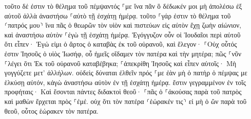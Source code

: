 \documentclass{openreader}
\begin{document}
τοῦτο δέ ἐστιν τὸ θέλημα τοῦ πέμψαντός ⸀με ἵνα πᾶν ὃ δέδωκέν μοι μὴ ἀπολέσω ἐξ αὐτοῦ ἀλλὰ ἀναστήσω ⸀αὐτὸ τῇ ἐσχάτῃ ἡμέρᾳ. 
τοῦτο ⸀γάρ ἐστιν τὸ θέλημα τοῦ ⸂πατρός μου⸃ ἵνα πᾶς ὁ θεωρῶν τὸν υἱὸν καὶ πιστεύων εἰς αὐτὸν ἔχῃ ζωὴν αἰώνιον, καὶ ἀναστήσω αὐτὸν ⸀ἐγὼ τῇ ἐσχάτῃ ἡμέρᾳ. 
Ἐγόγγυζον οὖν οἱ Ἰουδαῖοι περὶ αὐτοῦ ὅτι εἶπεν· Ἐγώ εἰμι ὁ ἄρτος ὁ καταβὰς ἐκ τοῦ οὐρανοῦ, 
καὶ ἔλεγον· ⸀Οὐχ οὗτός ἐστιν Ἰησοῦς ὁ υἱὸς Ἰωσήφ, οὗ ἡμεῖς οἴδαμεν τὸν πατέρα καὶ τὴν μητέρα; πῶς ⸀νῦν ⸀λέγει ὅτι Ἐκ τοῦ οὐρανοῦ καταβέβηκα; 
⸀ἀπεκρίθη Ἰησοῦς καὶ εἶπεν αὐτοῖς· Μὴ γογγύζετε μετ’ ἀλλήλων. 
οὐδεὶς δύναται ἐλθεῖν πρός ⸀με ἐὰν μὴ ὁ πατὴρ ὁ πέμψας με ἑλκύσῃ αὐτόν, κἀγὼ ἀναστήσω αὐτὸν ἐν τῇ ἐσχάτῃ ἡμέρᾳ. 
ἔστιν γεγραμμένον ἐν τοῖς προφήταις· Καὶ ἔσονται πάντες διδακτοὶ θεοῦ· ⸀πᾶς ὁ ⸀ἀκούσας παρὰ τοῦ πατρὸς καὶ μαθὼν ἔρχεται πρὸς ⸀ἐμέ. 
οὐχ ὅτι τὸν πατέρα ⸂ἑώρακέν τις⸃ εἰ μὴ ὁ ὢν παρὰ τοῦ θεοῦ, οὗτος ἑώρακεν τὸν πατέρα. 
\end{document}
